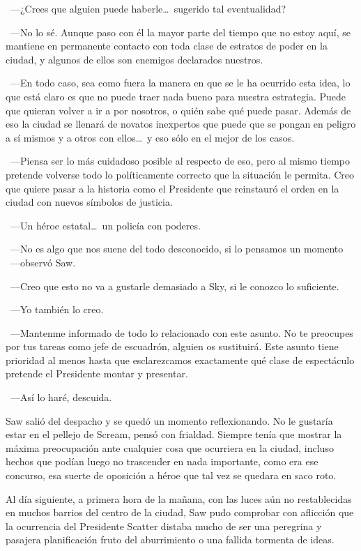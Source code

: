 ~---¿Crees que alguien puede haberle\dots\ sugerido tal eventualidad?

~---No lo sé. Aunque paso con él la mayor parte del tiempo que no estoy aquí, se mantiene en permanente contacto con toda clase de estratos de poder en la ciudad, y algunos de ellos son enemigos declarados nuestros.

~---En todo caso, sea como fuera la manera en que se le ha ocurrido esta idea, lo que está claro es que no puede traer nada bueno para nuestra estrategia. Puede que quieran volver a ir a por nosotros, o quién sabe qué puede pasar. Además de eso la ciudad se llenará de novatos inexpertos que puede que se pongan en peligro a sí mismos y a otros con ellos\dots\ y eso sólo en el mejor de los casos.

~---Piensa ser lo más cuidadoso posible al respecto de eso, pero al mismo tiempo pretende volverse todo lo políticamente correcto que la situación le permita. Creo que quiere pasar a la historia como el Presidente que reinstauró el orden en la ciudad con nuevos símbolos de justicia.

~---Un héroe estatal\dots\ un policía con poderes.

~---No es algo que nos suene del todo desconocido, si lo pensamos un momento ~---observó Saw.

~---Creo que esto no va a gustarle demasiado a Sky, si le conozco lo suficiente.

~---Yo también lo creo.

~---Mantenme informado de todo lo relacionado con este asunto. No te preocupes por tus tareas como jefe de escuadrón, alguien os sustituirá. Este asunto tiene prioridad al menos hasta que esclarezcamos exactamente qué clase de espectáculo pretende el Presidente montar y presentar.

~---Así lo haré, descuida.

Saw salió del despacho y se quedó un momento reflexionando. No le gustaría estar en el pellejo de Scream, pensó con frialdad. Siempre tenía que mostrar la máxima preocupación ante cualquier cosa que ocurriera en la ciudad, incluso hechos que podían luego no trascender en nada importante, como era ese concurso, esa suerte de oposición a héroe que tal vez se quedara en saco roto.

 

Al día siguiente, a primera hora de la mañana, con las luces aún no restablecidas en muchos barrios del centro de la ciudad, Saw pudo comprobar con aflicción que la ocurrencia del Presidente Scatter distaba mucho de ser una peregrina y pasajera planificación fruto del aburrimiento o una fallida tormenta de ideas.

